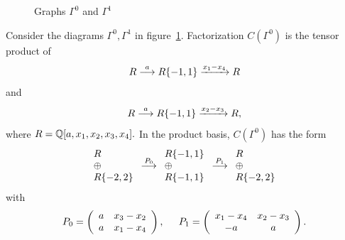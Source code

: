 \documentclass[12pt]{article}
\begin{document}
\begin{figure}  \caption{Graphs $\Gamma^0$
and $\Gamma^1$} \label{pair2}
 \end{figure}

Consider the diagrams $\Gamma^0, \Gamma^1$ in figure~\ref{pair2}. 
Factorization $C(\Gamma^0)$ is the tensor product of 
$$ R \stackrel{a}{\longrightarrow} R\{-1,1\} \xrightarrow{x_1-x_4} R $$
and 
$$ R \stackrel{a}{\longrightarrow} R\{-1,1\} \xrightarrow{x_2-x_3} R,$$
where $R=\mathbb Q[a,x_1,x_2,x_3,x_4].$ In the product basis, 
$C(\Gamma^0)$ has the form 
\begin{equation*}
  \begin{array}{l}R \\  \oplus \\ R\{-2,2\}\end{array}
  \stackrel{P_0}{\longrightarrow}
  \begin{array}{l} R\{-1,1\} \\ \oplus \\ R\{-1,1\}  \end{array}
  \stackrel{P_1}{\longrightarrow} 
  \begin{array}{l}R \\ \oplus \\ R\{-2,2\}\end{array}
\end{equation*}
with 
\begin{equation*}
P_0=\left(\begin{array}{cc} a  & x_3-x_2 \\
      a   & x_1-x_4 \end{array} \right), \hspace{0.2in}
P_1=\left(\begin{array}{cc} x_1-x_4  & x_2-x_3 \\
      -a  & a \end{array} \right).
\end{equation*}
\end{document}
